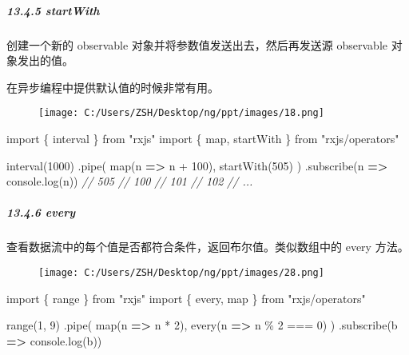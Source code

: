 \documentclass[
]{article}
\newenvironment{Shaded}{}{}
\newcommand{\BuiltInTok}[1]{#1}
\newcommand{\CommentTok}[1]{\textcolor[rgb]{0.38,0.63,0.69}{\textit{#1}}}
\newcommand{\DecValTok}[1]{\textcolor[rgb]{0.25,0.63,0.44}{#1}}
\newcommand{\FunctionTok}[1]{\textcolor[rgb]{0.02,0.16,0.49}{#1}}
\newcommand{\ImportTok}[1]{#1}
\newcommand{\KeywordTok}[1]{\textcolor[rgb]{0.00,0.44,0.13}{\textbf{#1}}}
\newcommand{\NormalTok}[1]{#1}
\newcommand{\OperatorTok}[1]{\textcolor[rgb]{0.40,0.40,0.40}{#1}}
\newcommand{\StringTok}[1]{\textcolor[rgb]{0.25,0.44,0.63}{#1}}
\begin{document}
\hypertarget{1345-startwith}{%
\subparagraph{13.4.5 startWith}\label{1345-startwith}}

创建一个新的 observable 对象并将参数值发送出去，然后再发送源 observable
对象发出的值。

在异步编程中提供默认值的时候非常有用。

\begin{figure}
\centering
\texttt{[image: C:/Users/ZSH/Desktop/ng/ppt/images/18.png]}
\caption{}
\end{figure}

\begin{Shaded}
\begin{Highlighting}[]
\ImportTok{import}\NormalTok{ \{ interval \} }\ImportTok{from} \StringTok{"rxjs"}
\ImportTok{import}\NormalTok{ \{ map}\OperatorTok{,}\NormalTok{ startWith \} }\ImportTok{from} \StringTok{"rxjs/operators"}

\FunctionTok{interval}\NormalTok{(}\DecValTok{1000}\NormalTok{)}
  \OperatorTok{.}\FunctionTok{pipe}\NormalTok{(}
    \FunctionTok{map}\NormalTok{(n }\KeywordTok{=\textgreater{}}\NormalTok{ n }\OperatorTok{+} \DecValTok{100}\NormalTok{)}\OperatorTok{,}
    \FunctionTok{startWith}\NormalTok{(}\DecValTok{505}\NormalTok{)}
\NormalTok{  )}
  \OperatorTok{.}\FunctionTok{subscribe}\NormalTok{(n }\KeywordTok{=\textgreater{}} \BuiltInTok{console}\OperatorTok{.}\FunctionTok{log}\NormalTok{(n))}
\CommentTok{// 505}
\CommentTok{// 100}
\CommentTok{// 101}
\CommentTok{// 102}
\CommentTok{// ...}
\end{Highlighting}
\end{Shaded}

\hypertarget{1346-every}{%
\subparagraph{13.4.6 every}\label{1346-every}}

查看数据流中的每个值是否都符合条件，返回布尔值。类似数组中的 every
方法。

\begin{figure}
\centering
\texttt{[image: C:/Users/ZSH/Desktop/ng/ppt/images/28.png]}
\caption{}
\end{figure}

\begin{Shaded}
\begin{Highlighting}[]
\ImportTok{import}\NormalTok{ \{ range \} }\ImportTok{from} \StringTok{"rxjs"}
\ImportTok{import}\NormalTok{ \{ every}\OperatorTok{,}\NormalTok{ map \} }\ImportTok{from} \StringTok{"rxjs/operators"}

\FunctionTok{range}\NormalTok{(}\DecValTok{1}\OperatorTok{,} \DecValTok{9}\NormalTok{)}
  \OperatorTok{.}\FunctionTok{pipe}\NormalTok{(}
    \FunctionTok{map}\NormalTok{(n }\KeywordTok{=\textgreater{}}\NormalTok{ n }\OperatorTok{*} \DecValTok{2}\NormalTok{)}\OperatorTok{,}
    \FunctionTok{every}\NormalTok{(n }\KeywordTok{=\textgreater{}}\NormalTok{ n }\OperatorTok{\%} \DecValTok{2} \OperatorTok{===} \DecValTok{0}\NormalTok{)}
\NormalTok{  )}
  \OperatorTok{.}\FunctionTok{subscribe}\NormalTok{(b }\KeywordTok{=\textgreater{}} \BuiltInTok{console}\OperatorTok{.}\FunctionTok{log}\NormalTok{(b))}
\end{Highlighting}
\end{Shaded}
\end{document}
